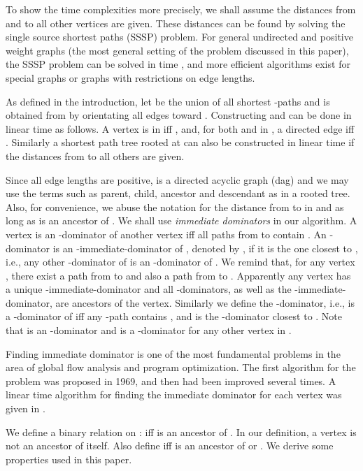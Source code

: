To show the time complexities more precisely, we shall assume the distances from  and  to all other vertices are given.
These distances can be found by solving the single source shortest paths (SSSP) problem. For general undirected and positive weight graphs (the most general setting of the problem discussed in this paper), the SSSP problem can be solved in  time \cite{cor01,dijk}, and more efficient algorithms exist for special graphs or graphs with restrictions on edge lengths.
 
As defined in the introduction, let  be the union of all shortest -paths and  is obtained from  by orientating all edges toward . Constructing  and  can be done in linear time as follows. A vertex  is in  iff , and, for both  and  in , a directed edge  iff . Similarly a shortest path tree rooted at  can also be constructed in linear time if the distances from  to all others are given.

Since all edge lengths are positive,  is a directed acyclic graph (dag) and we may use the terms such as parent, child, ancestor and descendant as in a rooted tree. Also, for convenience, we abuse the notation  for the distance from  to  in  and   as long as  is an ancestor of .   
We shall use \emph{immediate dominators} in our algorithm. 
A vertex  is an -dominator of another vertex  iff all paths from  to  contain . 
An -dominator  is an -immediate-dominator of , denoted by , if it is the one closest to , i.e., any other -dominator of  is an -dominator of .
We remind that, for any vertex , there exist a path from  to  and also a path from  to .
Apparently any vertex has a unique -immediate-dominator and all -dominators, as well as the -immediate-dominator, are ancestors of the vertex.
Similarly we define the -dominator, i.e.,  is a -dominator of  iff any -path contains , and  is the -dominator closest to .
Note that  is an -dominator and  is a -dominator for any other vertex in .  

Finding immediate dominator is one of the most fundamental problems in the area of global flow analysis and 
program optimization. The first algorithm for the problem was proposed in 1969, and then had
been improved several times. A linear time algorithm for finding the immediate dominator for each vertex was given in \cite{als99}. 

We define a binary relation on :  iff  is an ancestor of . In our definition, a vertex is not an ancestor of itself. Also define  iff  is an ancestor of  or .
We derive some properties used in this paper.

